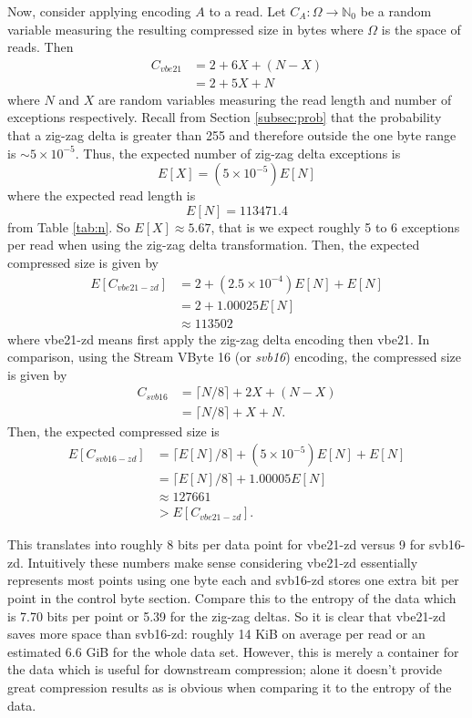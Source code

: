 Now, consider applying encoding $A$ to a read. Let $C_A:\Omega\to\mathbb{N}_0$
be a random variable measuring the resulting compressed size in bytes where
$\Omega$ is the space of reads. Then
\begin{align*}
	C_{vbe21} &= 2 + 6X + (N - X)\\
	&= 2 + 5X + N
\end{align*}
where $N$ and $X$ are random variables measuring the read length and number of
exceptions respectively. Recall from Section \ref{subsec:prob} that the
probability that a zig-zag delta is greater than 255 and therefore outside the one
byte range is $\sim 5\times 10^{-5}$. Thus, the expected number of zig-zag delta
exceptions is
\[ E[X] = (5 \times 10^{-5})E[N] \]
where the expected read length is
\[ E[N] = 113471.4 \]
from Table \ref{tab:n}. So $E[X] \approx 5.67$, that is we expect roughly 5 to 6
exceptions per read when using the zig-zag delta transformation.
Then, the expected compressed size is given by
\begin{align*}
	E[C_{vbe21-zd}] &= 2 + (2.5\times 10^{-4})E[N]+ E[N]\\
	&= 2 + 1.00025E[N]\\
	&\approx 113502
\end{align*}
where vbe21-zd means first apply the zig-zag delta encoding then vbe21. In
comparison, using the Stream VByte 16 (or \textit{svb16}) encoding, the
compressed size is given by
\begin{align*}
	C_{svb16} &= \lceil N/8 \rceil + 2X + (N - X)\\
	&= \lceil N/8 \rceil + X + N.
\end{align*}
Then, the expected compressed size is
\begin{align*}
	E[C_{svb16-zd}] &= \lceil E[N]/8 \rceil + (5 \times 10^{-5})E[N] + E[N]\\
	&= \lceil E[N]/8 \rceil + 1.00005E[N]\\
	&\approx 127661\\
	&> E[C_{vbe21-zd}].
\end{align*}

This translates into roughly 8 bits per data point for vbe21-zd versus
9 for svb16-zd.
Intuitively these numbers make sense considering vbe21-zd essentially represents
most points using one byte each and svb16-zd stores one extra bit per point in
the control byte section.  Compare this to the entropy of the data which is 7.70
bits per point or 5.39 for the zig-zag deltas. So it is clear that
vbe21-zd saves more space than svb16-zd: roughly 14 KiB on average per read or
an estimated 6.6 GiB for the whole data set. However, this is merely a container
for the data which is useful for downstream compression; alone it doesn't
provide great compression results as is obvious when comparing it to the entropy
of the data.

